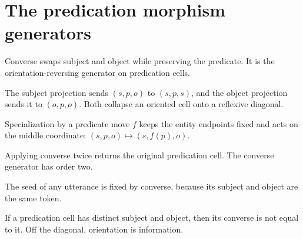\section{The predication morphism generators}

\begin{proposition}[Converse]\label{thm:predication-converse}\leanok{}
Converse swaps subject and object while preserving the predicate. It is the
orientation-reversing generator on predication cells.
\end{proposition}

\begin{proposition}[Projections]\label{thm:predication-proj}\leanok{}
The subject projection sends $(s,p,o)$ to $(s,p,s)$, and the object
projection sends it to $(o,p,o)$. Both collapse an oriented cell onto a
reflexive diagonal.
\end{proposition}

\begin{proposition}[Specialization]\label{thm:predication-specialize}\leanok{}
Specialization by a predicate move $f$ keeps the entity endpoints fixed and
acts on the middle coordinate: $(s,p,o)\mapsto (s,f(p),o)$.
\end{proposition}

\begin{theorem}\label{thm:converse-involution}\leanok{}
Applying converse twice returns the original predication cell. The converse
generator has order two.
\end{theorem}

\begin{theorem}\label{thm:converse-seed}\leanok{}
The seed of any utterance is fixed by converse, because its subject and object
are the same token.
\end{theorem}

\begin{theorem}\label{thm:converse-orientation}\leanok{}
If a predication cell has distinct subject and object, then its converse is
not equal to it. Off the diagonal, orientation is information.
\end{theorem}

